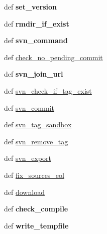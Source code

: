 \begin{DoxyCompactItemize}
\item 
\hypertarget{namespacemakerelease_a6d2fb35b3c19b760b55cf56a96c986a2}{def {\bfseries set\+\_\+version}}\label{namespacemakerelease_a6d2fb35b3c19b760b55cf56a96c986a2}

\item 
\hypertarget{namespacemakerelease_aae500da94fb85f00942f1a77061f7418}{def {\bfseries rmdir\+\_\+if\+\_\+exist}}\label{namespacemakerelease_aae500da94fb85f00942f1a77061f7418}

\item 
\hypertarget{namespacemakerelease_a948b71711a5f6488c761be793a914753}{def {\bfseries svn\+\_\+command}}\label{namespacemakerelease_a948b71711a5f6488c761be793a914753}

\item 
def \hyperlink{namespacemakerelease_a1394b79b7c581a351a6636f44b7d3af3}{check\+\_\+no\+\_\+pending\+\_\+commit}
\item 
\hypertarget{namespacemakerelease_a7c95a648fac4b856a77d8cededb532fc}{def {\bfseries svn\+\_\+join\+\_\+url}}\label{namespacemakerelease_a7c95a648fac4b856a77d8cededb532fc}

\item 
def \hyperlink{namespacemakerelease_a4a87c78ffb58124f7ca8fa04dbe098ae}{svn\+\_\+check\+\_\+if\+\_\+tag\+\_\+exist}
\item 
def \hyperlink{namespacemakerelease_a07d7fbaca9a0c0f020a94cb517a726d5}{svn\+\_\+commit}
\item 
def \hyperlink{namespacemakerelease_a83fb6289739248902a4582b3065596be}{svn\+\_\+tag\+\_\+sandbox}
\item 
def \hyperlink{namespacemakerelease_aab18424bd00cfff0e43dc4d2be3c8941}{svn\+\_\+remove\+\_\+tag}
\item 
def \hyperlink{namespacemakerelease_a2ecf56cc7d208248812e82c16c5cef31}{svn\+\_\+export}
\item 
def \hyperlink{namespacemakerelease_a33947ed908fd585684a839e893a483c9}{fix\+\_\+sources\+\_\+eol}
\item 
def \hyperlink{namespacemakerelease_a73900f16465b5a348bb5dce4c6300e2f}{download}
\item 
\hypertarget{namespacemakerelease_a8ec8337fd7d8fd6355b76ffb5a7108cd}{def {\bfseries check\+\_\+compile}}\label{namespacemakerelease_a8ec8337fd7d8fd6355b76ffb5a7108cd}

\item 
\hypertarget{namespacemakerelease_a45d0c7ea68f28a8997134605832af79f}{def {\bfseries write\+\_\+tempfile}}\label{namespacemakerelease_a45d0c7ea68f28a8997134605832af79f}


\end{DoxyCompactItemize}
